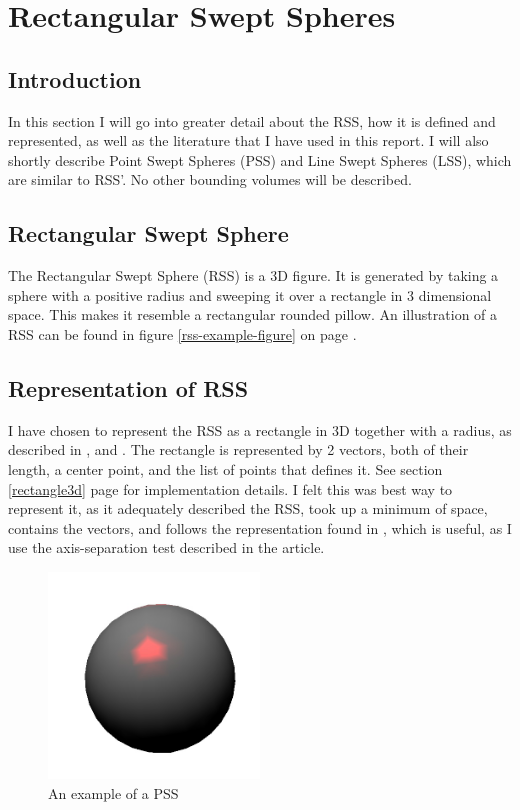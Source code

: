 
\section{Rectangular Swept Spheres}
\label{rss}

\subsection{Introduction}
In this section I will go into greater detail about the RSS, how it is defined and represented, as well as the literature that I have used in this report. I will also shortly describe Point Swept Spheres (PSS) and Line Swept Spheres (LSS), which are similar to RSS'. No other bounding volumes will be described. 

\subsection{Rectangular Swept Sphere}
The Rectangular Swept Sphere (RSS) is a 3D figure. It is generated by taking a sphere with a positive radius and sweeping it over a rectangle in 3 dimensional space. This makes it resemble a rectangular rounded pillow. An illustration of a RSS can be found in figure \ref{rss-example-figure} on page \pageref{rss-example-figure}. 

\subsection{Representation of RSS}
I have chosen to represent the RSS as a rectangle in 3D together with a radius, as described in \cite{larsen00fast}, \cite{Larsen99fastproximity} and \cite{237244}. The rectangle is represented by 2 vectors, both of their length, a center point, and the list of points that defines it. See section \ref{rectangle3d} page \pageref{rectangle3d} for  implementation details. I felt this was best way to represent it, as it adequately described the RSS, took up a minimum of space, contains the vectors, and follows the representation found in \cite{237244}, which is useful, as I use the axis-separation test described in the article.

\begin{figure}
\centering
\includegraphics[width=0.5\textwidth]{figures/pss}
\caption{\label{pss-example}An example of a PSS}
\end{figure}

